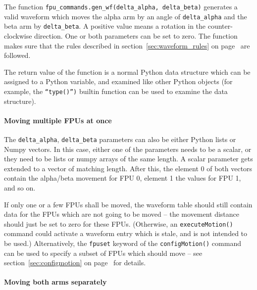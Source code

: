 \documentclass[11pt,a4paper]{scrartcl}
\begin{document}

The function \texttt{fpu\_commands.gen\_wf(delta\_alpha,
  delta\_beta)} generates a valid waveform which moves the alpha arm
by an angle of \texttt{delta\_alpha} and the beta arm by
\texttt{delta\_beta}. A positive value means a rotation in the
counter-clockwise direction.  One or both parameters can be set to
zero. The function makes sure that the rules described in
section~\ref{sec:waveform_rules} on page~\pageref{sec:waveform_rules}
are followed.

The return value of the function is a normal Python data structure
which can be assigned to a Python variable, and examined like other
Python objects (for example, the \texttt{``type()'')} builtin function
can be used to examine the data structure).

\paragraph{Moving multiple FPUs at once}
 The
\verb+delta_alpha+, \verb+delta_beta+ parameters can also be either
Python lists or Numpy vectors. In this case, either one of the
parameters needs to be a scalar, or they need to be lists or numpy
arrays of the same length. A scalar parameter gets extended to a
vector of matching length. After this, the element 0 of both vectors
contain the alpha/beta movement for FPU 0, element 1 the values for
FPU 1, and so on.

If only one or a few FPUs shall be moved, the waveform table should
still contain data for the FPUs which are not going to be moved -- the
movement distance should just be set to zero for these FPUs.
(Otherwise, an \texttt{executeMotion()} command could activate a
waveform entry which is stale, and is not intended to be used.)
Alternatively, the \texttt{fpuset} keyword of the
\texttt{configMotion()} command can be used to specify a subset of FPUs
which should move -- see section~\ref{sec:configmotion} on
page~\pageref{sec:configmotion} for details.

\paragraph{Moving both arms separately}
\end{document}
